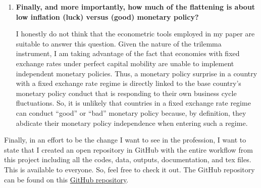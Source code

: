 \documentclass[12pt]{article}
\begin{document}
\begin{enumerate}
\item \textbf{Finally, and more importantly, how much of the flattening is about low inflation (luck) versus (good) monetary policy?} 

I honestly do not think that the econometric tools employed in my paper are suitable to answer this question. Given the nature of the trilemma instrument, I am taking advantage of the fact that economies with fixed exchange rates under perfect capital mobility are unable to implement independent monetary policies. Thus, a monetary policy surprise in a country with a fixed exchange rate regime is directly linked to the base country’s monetary policy conduct that is responding to their own business cycle fluctuations. So, it is unlikely that countries in a fixed exchange rate regime can conduct “good” or “bad” monetary policy because, by definition, they abdicate their monetary policy independence when entering such a regime.


\end{enumerate}

Finally, in an effort to be the change I want to see in the profession, I want to state that I created an open repository in GitHub with the entire workflow from this project including all the codes, data, outputs, documentation, and tex files. This is available to everyone. So, feel free to check it out. The GitHub repository can be found on this \href{https://github.com/RicardoGabriel/Monetary-Policy-and-the-Wage-Inflation-Unemployment-Tradeoff}{GitHub repository}.

\renewcommand\bibname{References}

\begin{singlespace}
	\setlength{\bibsep}{5pt}
	
	
\end{singlespace}
\end{document}
